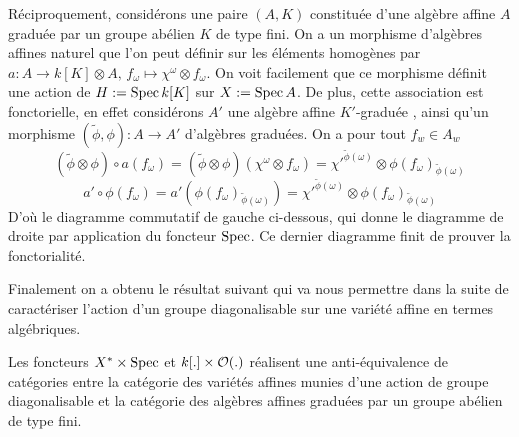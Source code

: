 Réciproquement, considérons une paire $(A, K)$ constituée d'une algèbre affine $A$ graduée par un groupe abélien $K$ de type fini. On a un morphisme d'algèbres affines naturel que l'on peut définir sur les éléments homogènes par $a:A\rightarrow k[K]\otimes A,\, f_{\omega}\mapsto \chi^{\omega}\otimes f_{\omega}$. On voit facilement que ce morphisme définit une action de $H:=\operatorname{Spec} k[K]$ sur $X:=\operatorname{Spec} A$. De plus, cette association est fonctorielle, en effet considérons $A'$ une algèbre affine $K'$-graduée , ainsi qu'un morphisme $(\widetilde{\phi},\phi):A\rightarrow A'$ d'algèbres graduées. On a pour tout $f_w\in A_w$
$$(\widetilde{\phi}\otimes \phi)\circ a(f_\omega)=(\widetilde{\phi}\otimes \phi)(\chi^{\omega}\otimes f_\omega) = \chi'^{\widetilde{\phi}(\omega)}\otimes \phi(f_\omega)_{\widetilde{\phi}(\omega)}$$ 
$$a'\circ \phi(f_\omega)=a'(\phi(f_\omega)_{\widetilde{\phi}(\omega)})=\chi'^{\widetilde{\phi}(\omega)}\otimes \phi(f_\omega)_{\widetilde{\phi}(\omega)}$$
D'où le diagramme commutatif de gauche ci-dessous, qui donne le diagramme de droite par application du foncteur $\operatorname{Spec}$. Ce dernier diagramme finit de prouver la fonctorialité.
\begin{multicols}{2}
	\begin{center}
	\end{center}

	\columnbreak
	\begin{center}
	\end{center}
\end{multicols}

Finalement on a obtenu le résultat suivant qui va nous permettre dans la suite de caractériser l'action d'un groupe diagonalisable sur une variété affine en termes algébriques.

\begin{prop}
Les foncteurs $X^*\times\operatorname{Spec}$ et $k[.]\times\mathcal{O}(.)$ réalisent une anti-équivalence de catégories entre la catégorie des variétés affines munies d'une action de groupe diagonalisable et la catégorie des algèbres affines graduées par un groupe abélien de type fini. 
\end{prop}

